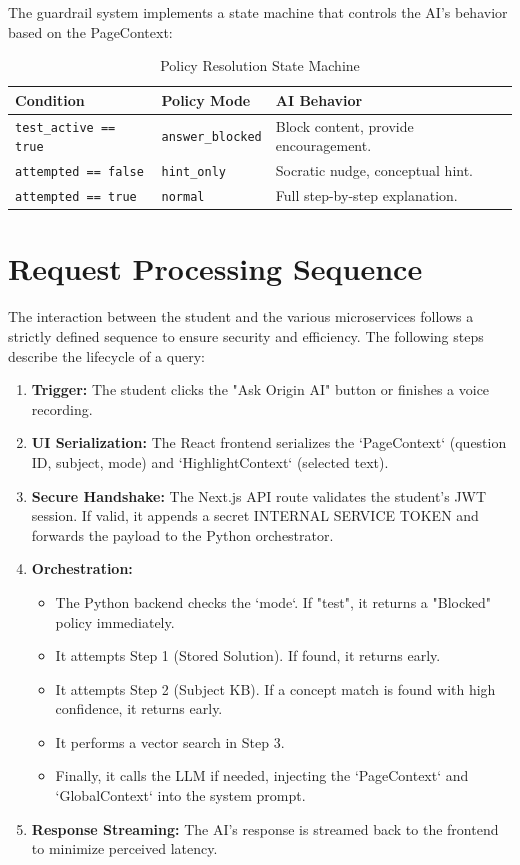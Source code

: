 The guardrail system implements a state machine that controls the AI's behavior based on the PageContext:

\begin{table}[htbp]
\centering
\caption{Policy Resolution State Machine}
\label{tab:guardrails}
\begin{tabular}{|l|l|l|}
\hline
\textbf{Condition} & \textbf{Policy Mode} & \textbf{AI Behavior} \\ \hline
\texttt{test\_active == true} & \texttt{answer\_blocked} & Block content, provide encouragement. \\ \hline
\texttt{attempted == false} & \texttt{hint\_only} & Socratic nudge, conceptual hint. \\ \hline
\texttt{attempted == true} & \texttt{normal} & Full step-by-step explanation. \\ \hline
\end{tabular}
\end{table}

\section{Request Processing Sequence}

The interaction between the student and the various microservices follows a strictly defined sequence to ensure security and efficiency. The following steps describe the lifecycle of a query:

\begin{enumerate}
    \item \textbf{Trigger:} The student clicks the "Ask Origin AI" button or finishes a voice recording.
    \item \textbf{UI Serialization:} The React frontend serializes the `PageContext` (question ID, subject, mode) and `HighlightContext` (selected text).
    \item \textbf{Secure Handshake:} The Next.js API route validates the student's JWT session. If valid, it appends a secret INTERNAL SERVICE TOKEN and forwards the payload to the Python orchestrator.
    \item \textbf{Orchestration:}
    \begin{itemize}
        \item The Python backend checks the `mode`. If "test", it returns a "Blocked" policy immediately.
        \item It attempts Step 1 (Stored Solution). If found, it returns early.
        \item It attempts Step 2 (Subject KB). If a concept match is found with high confidence, it returns early.
        \item It performs a vector search in Step 3.
        \item Finally, it calls the LLM if needed, injecting the `PageContext` and `GlobalContext` into the system prompt.
    \end{itemize}
    \item \textbf{Response Streaming:} The AI's response is streamed back to the frontend to minimize perceived latency.
\end{enumerate}

